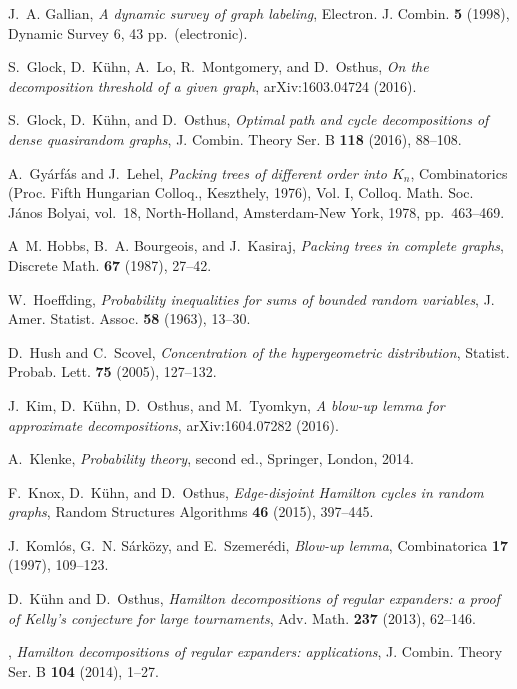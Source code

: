 \documentclass[a4paper, 11pt, reqno]{amsart}
\numberwithin{equation}{section}
\newcommand{\1}{{\rm 1\hspace*{-0.4ex}%
\rule{0.1ex}{1.52ex}\hspace*{0.2ex}}}
\begin{document}
\begin{thebibliography}{10}
J.~A. Gallian, \emph{A dynamic survey of graph labeling}, Electron. J. Combin.
  \textbf{5} (1998), Dynamic Survey 6, 43 pp.\ (electronic).

S.~Glock, D.~K{\"u}hn, A.~Lo, R.~Montgomery, and D.~Osthus, \emph{On the
  decomposition threshold of a given graph}, arXiv:1603.04724 (2016).

S.~Glock, D.~K{\"u}hn, and D.~Osthus, \emph{Optimal path and cycle
  decompositions of dense quasirandom graphs}, J. Combin. Theory Ser. B
  \textbf{118} (2016), 88--108.

A.~Gy{\'a}rf{\'a}s and J.~Lehel, \emph{Packing trees of different order into
  {$K_{n}$}}, Combinatorics ({P}roc. {F}ifth {H}ungarian {C}olloq.,
  {K}eszthely, 1976), {V}ol. {I}, Colloq. Math. Soc. J\'anos Bolyai, vol.~18,
  North-Holland, Amsterdam-New York, 1978, pp.~463--469.

A~M. Hobbs, B.~A. Bourgeois, and J.~Kasiraj, \emph{Packing trees in complete
  graphs}, Discrete Math. \textbf{67} (1987), 27--42.

W.~Hoeffding, \emph{Probability inequalities for sums of bounded random
  variables}, J. Amer. Statist. Assoc. \textbf{58} (1963), 13--30.

D.~Hush and C.~Scovel, \emph{Concentration of the hypergeometric distribution},
  Statist. Probab. Lett. \textbf{75} (2005), 127--132.

J.~Kim, D.~K{\"u}hn, D.~Osthus, and M.~Tyomkyn, \emph{A blow-up lemma for
  approximate decompositions}, arXiv:1604.07282 (2016).

A.~Klenke, \emph{Probability theory}, second ed., Springer, London, 2014.

F.~Knox, D.~K{\"u}hn, and D.~Osthus, \emph{Edge-disjoint {H}amilton cycles in
  random graphs}, Random Structures Algorithms \textbf{46} (2015), 397--445.

J.~Koml{\'o}s, G.~N. S{\'a}rk{\"o}zy, and E.~Szemer{\'e}di, \emph{Blow-up
  lemma}, Combinatorica \textbf{17} (1997), 109--123.

D.~K{\"u}hn and D.~Osthus, \emph{Hamilton decompositions of regular expanders:
  a proof of {K}elly's conjecture for large tournaments}, Adv. Math.
  \textbf{237} (2013), 62--146.

\bysame, \emph{Hamilton decompositions of regular expanders: applications}, J.
  Combin. Theory Ser. B \textbf{104} (2014), 1--27.


\end{thebibliography}
\end{document}
